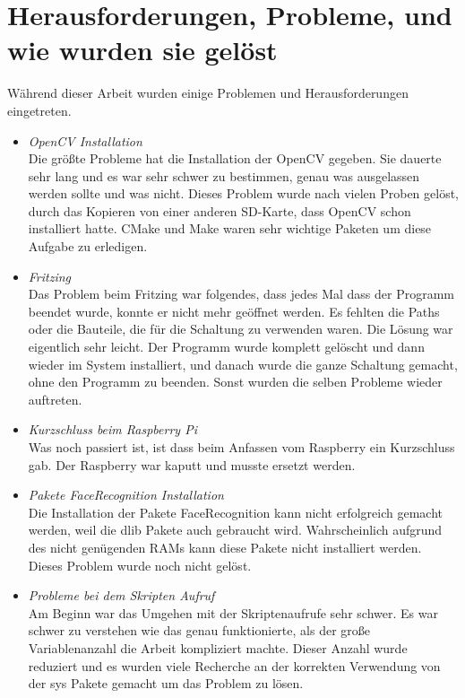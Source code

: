 \section{Herausforderungen, Probleme, und wie wurden sie gelöst}
W{\"a}hrend dieser Arbeit wurden einige Problemen und Herausforderungen eingetreten.
	\begin{itemize}
		\item \textit{OpenCV Installation}\\
		Die gr{\"o}ßte Probleme hat die Installation der OpenCV gegeben. Sie dauerte sehr lang und es war sehr schwer zu bestimmen, genau was ausgelassen werden sollte und was nicht. Dieses Problem wurde nach vielen Proben gel{\"o}st, durch das Kopieren von einer anderen SD-Karte, dass OpenCV schon installiert hatte. CMake und Make waren sehr wichtige Paketen um diese Aufgabe zu erledigen.
		\item \textit{Fritzing} \\
		Das Problem beim Fritzing war folgendes, dass jedes Mal dass der Programm beendet wurde, konnte er nicht mehr ge{\"o}ffnet werden. Es fehlten die Paths oder die Bauteile, die f{\"u}r die Schaltung zu verwenden waren. Die L{\"o}sung war eigentlich sehr leicht. Der Programm wurde komplett gel{\"o}scht und dann wieder im System installiert, und danach wurde die ganze Schaltung gemacht, ohne den Programm zu beenden. Sonst wurden die selben Probleme wieder auftreten.
		\item \textit{Kurzschluss beim Raspberry Pi}\\
		Was noch passiert ist, ist dass beim Anfassen vom Raspberry ein Kurzschluss gab. Der Raspberry war kaputt und musste ersetzt werden.
		\item \textit{Pakete FaceRecognition Installation} \\
		Die Installation der Pakete FaceRecognition kann nicht erfolgreich gemacht werden, weil die dlib Pakete auch gebraucht wird. Wahrscheinlich aufgrund des nicht gen{\"u}genden RAMs kann diese Pakete nicht installiert werden. Dieses Problem wurde noch nicht gel{\"o}st.
		\item \textit{Probleme bei dem Skripten Aufruf} \\
		Am Beginn war das Umgehen mit der Skriptenaufrufe sehr schwer. Es war schwer zu verstehen wie das genau funktionierte, als der große Variablenanzahl die Arbeit kompliziert machte. Dieser Anzahl wurde reduziert und es wurden viele Recherche an der korrekten Verwendung von der sys Pakete gemacht um das Problem zu l{\"o}sen.
	\end{itemize}
